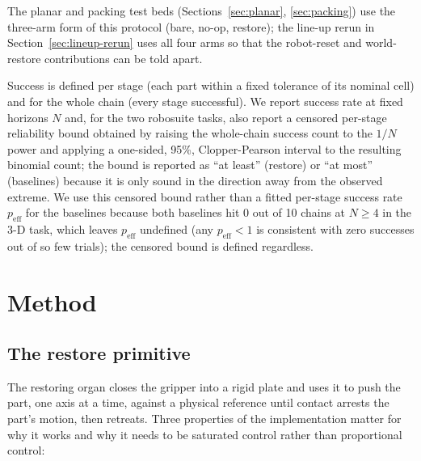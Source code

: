\documentclass[11pt]{article}
\begin{document}
The planar and packing test beds (Sections~\ref{sec:planar},
\ref{sec:packing}) use the three-arm form of this protocol (bare, no-op,
restore); the line-up rerun in Section~\ref{sec:lineup-rerun} uses all four
arms so that the robot-reset and world-restore contributions can be told
apart.

Success is defined per stage (each part within a fixed tolerance of its
nominal cell) and for the whole chain (every stage successful). We report
success rate at fixed horizons $N$ and, for the two robosuite tasks, also
report a censored per-stage reliability bound obtained by raising the
whole-chain success count to the $1/N$ power and applying a one-sided,
95\%, Clopper-Pearson interval \citep{clopperpearson1934} to the resulting
binomial count; the bound is reported as ``at least'' (restore) or ``at
most'' (baselines) because it is only sound in the direction away from the
observed extreme. We use this censored bound rather than a fitted per-stage
success rate $p_{\mathrm{eff}}$ for the baselines because both baselines hit
0 out of 10 chains at $N \geq 4$ in the 3-D task, which leaves $p_{\mathrm{eff}}$
undefined (any $p_{\mathrm{eff}} < 1$ is consistent with zero successes out of
so few trials); the censored bound is defined regardless.

\section{Method}
\label{sec:method}

\subsection{The restore primitive}
The restoring organ closes the gripper into a rigid plate and uses it to
push the part, one axis at a time, against a physical reference until
contact arrests the part's motion, then retreats. Three properties of the
implementation matter for why it works and why it needs to be saturated
control rather than proportional control:
\end{document}
